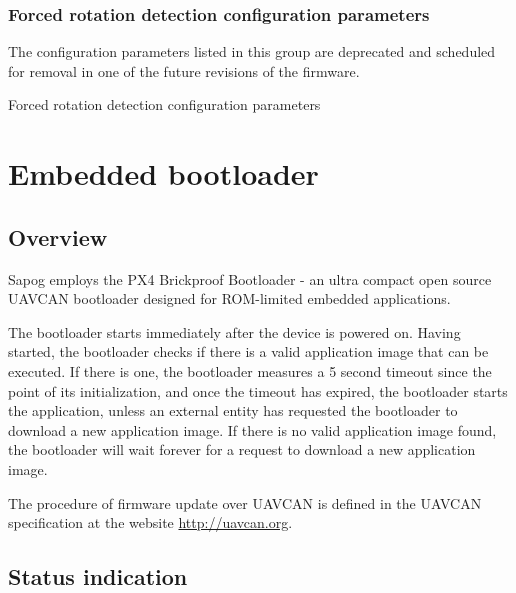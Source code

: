 \documentclass{zubaxdoc}
\begin{document}
	\subsection{Forced rotation detection configuration parameters}
	
	The configuration parameters listed in this group are deprecated and scheduled for removal in one
	of the future revisions of the firmware.
	
	\begin{CfgParamIndex}{Forced rotation detection configuration parameters}
	\end{CfgParamIndex}
	
	\chapter{Embedded bootloader}\label{sec:bootloader}
	
	\section{Overview}
	
	Sapog employs the PX4 Brickproof Bootloader - an ultra compact open source UAVCAN bootloader
	designed for ROM-limited embedded applications.
	
	The bootloader starts immediately after the device is powered on.
	Having started, the bootloader checks if there is a valid application image that can be executed.
	If there is one, the bootloader measures a 5 second timeout since the point of its initialization,
	and once the timeout has expired, the bootloader starts the application, unless an external
	entity has requested the bootloader to download a new application image.
	If there is no valid application image found, the bootloader will wait forever for a request
	to download a new application image.
	
	The procedure of firmware update over UAVCAN is defined in the UAVCAN specification at the website
	\url{http://uavcan.org}.
	
	\section{Status indication}
	
\end{document}

